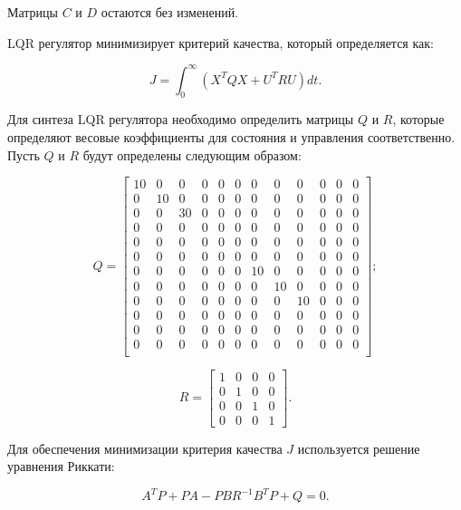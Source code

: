 Матрицы \(C\) и \(D\) остаются без изменений.

LQR регулятор минимизирует критерий качества, который определяется как:

\begin{equation}
    J = \int_0^\infty \left( X^T Q X + U^T R U \right) dt.
\end{equation}

Для синтеза LQR регулятора необходимо определить матрицы \(Q\) и \(R\), которые определяют весовые коэффициенты для состояния и 
управления соответственно.
Пусть \(Q\) и \(R\) будут определены следующим образом:

\[
    Q = \begin{bmatrix}
        10 & 0 & 0 & 0 & 0 & 0 & 0 & 0 & 0 & 0 & 0 & 0 \\ %
        0 & 10 & 0 & 0 & 0 & 0 & 0 & 0 & 0 & 0 & 0 & 0 \\ %
        0 & 0 & 30 & 0 & 0 & 0 & 0 & 0 & 0 & 0 & 0 & 0 \\ %
        0 & 0 & 0 & 0 & 0 & 0 & 0 & 0 & 0 & 0 & 0 & 0 \\ %
        0 & 0 & 0 & 0 & 0 & 0 & 0 & 0 & 0 & 0 & 0 & 0 \\ %
        0 & 0 & 0 & 0 & 0 & 0 & 0 & 0 & 0 & 0 & 0 & 0 \\ %
        0 & 0 & 0 & 0 & 0 & 0 & 10 & 0 & 0 & 0 & 0 & 0 \\ %
        0 & 0 & 0 & 0 & 0 & 0 & 0 & 10 & 0 & 0 & 0 & 0 \\ %
        0 & 0 & 0 & 0 & 0 & 0 & 0 & 0 & 10 & 0 & 0 & 0 \\ %
        0 & 0 & 0 & 0 & 0 & 0 & 0 & 0 & 0 & 0 & 0 & 0 \\    %
        0 & 0 & 0 & 0 & 0 & 0 & 0 & 0 & 0 & 0 & 0 & 0 \\    %
        0 & 0 & 0 & 0 & 0 & 0 & 0 & 0 & 0 & 0 & 0 & 0 \\    %
    \end{bmatrix};
\]

\[
    R = \begin{bmatrix}
        1 & 0 & 0 & 0  \\ %
        0 & 1 & 0 & 0 \\ %
        0 & 0 & 1 & 0  \\ %
        0 & 0 & 0 & 1
    \end{bmatrix}.
\]


Для обеспечения минимизации критерия качества \(J\) используется решение уравнения Риккати:

\begin{equation} 
    A^T P + P A - P B R^{-1} B^T P + Q = 0.
\end{equation}

